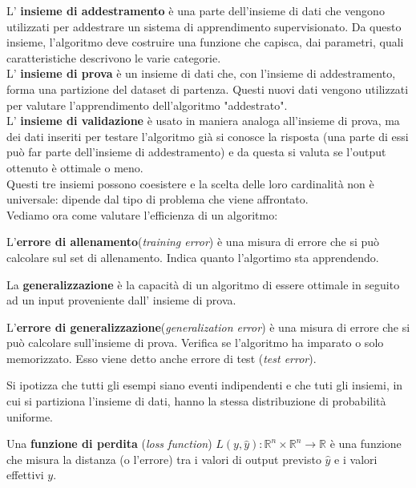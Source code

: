 \documentclass[a4paper,12pt,oneside]{book}
\begin{document}
L' \textbf{insieme di addestramento} \`e una parte dell'insieme di dati che vengono utilizzati per addestrare un sistema di apprendimento supervisionato. Da questo insieme, l'algoritmo deve costruire una funzione che capisca, dai parametri, quali caratteristiche descrivono le varie categorie.\\
L' \textbf{insieme di prova} \`e un insieme di dati che, con l'insieme di addestramento, forma una partizione del dataset di partenza. Questi nuovi dati vengono utilizzati per valutare l'apprendimento dell'algoritmo "addestrato".\\
L' \textbf{insieme di validazione} \`e usato in maniera analoga all'insieme di prova, ma dei dati inseriti per testare l'algoritmo gi\`{a} si conosce la risposta (una parte di essi pu\`{o} far parte dell'insieme di addestramento) e da questa si valuta se l'output ottenuto \`e ottimale o meno.\\
Questi tre insiemi possono coesistere e la scelta delle loro cardinalit\`{a} non \`e universale: dipende dal tipo di problema che viene affrontato.\\
Vediamo ora come valutare l'efficienza di un algoritmo:
\begin{defin}
L'\textbf{errore di allenamento}(\textit{training error}) \`e una misura di errore che si pu\`{o} calcolare sul set di allenamento. Indica quanto l'algortimo sta apprendendo.
\end{defin}
\begin{defin}
La \textbf{generalizzazione} \`e la capacit\`{a} di un algoritmo di essere ottimale in seguito ad un input proveniente dall' insieme di prova.
\end{defin}
\begin{defin}
L'\textbf{errore di generalizzazione}(\textit{generalization error}) \`e una misura di errore che si pu\`{o} calcolare sull'insieme di prova. Verifica se l'algoritmo ha imparato o solo memorizzato.
Esso viene detto anche errore di test (\textit{test error}).
\end{defin}
Si ipotizza che tutti gli esempi siano eventi indipendenti e che tuti gli insiemi, in cui si partiziona l'insieme di dati, hanno la stessa distribuzione di probabilit\`{a} uniforme.
\begin{defin}
Una \textbf{funzione di perdita} (\textit{loss function}) $L(y,\hat{y}):\mathbb{R}^{n} \times \mathbb{R}^{n} \rightarrow \mathbb{R}$ \`e una funzione che misura la distanza (o l'errore) tra i valori di output previsto $\hat{y}$ e i valori effettivi ${y}$.
\end{defin}
\end{document}
